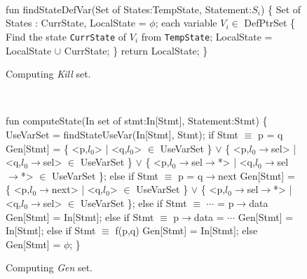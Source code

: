 \begin{figure}
\begin{framed}
{\tt
  \begin{program}{0}
  \FL fun findStateDefVar(Set of States:TempState, Statement:$S_i$)  \{
   Set of States : CurrState, LocalState = $\phi$;
   \FOR each variable $V_i\in$ DefPtrSet \{
   Find the state {\tt CurrState} of $V_i$ from {\tt TempState};
  LocalState = LocalState $\cup$ CurrState;
   \}
   return LocalState;
   \}
  \end{program}
}
\end{framed}
  \caption{Computing \emph{Kill} set.\label{fig:AlgoFindStateDefVar}}
\end{figure}
\begin{figure}
\begin{framed}
{\tt
  \begin{program}{0}
  \FL fun computeState(In set of stmt:In[Stmt], Statement:Stmt)  \{
   UseVarSet = findStateUseVar(In[Stmt], Stmt);
   if Stmt $\equiv$ p = q 
   Gen[Stmt] = \{ <p,$l_0$> | <q,$l_0$> $\in$ UseVarSet \} 
   $\vee$ \{ <p,$l_0\rightarrow$sel> | <q,$l_0\rightarrow$sel> $\in$ UseVarSet \}
   $\vee$ \{ <p,$l_0\rightarrow$sel$\rightarrow$*> | <q,$l_0\rightarrow$sel$\rightarrow$*> $\in$ UseVarSet \};
   else if Stmt $\equiv$ p = q$\rightarrow$next
   Gen[Stmt] = \{ <p,$l_0\rightarrow$next> | <q,$l_0$> $\in$ UseVarSet \} 
   $\vee$ \{ <p,$l_0\rightarrow$sel$\rightarrow$*> | <q,$l_0\rightarrow$sel> $\in$ UseVarSet \};
   else if Stmt $\equiv$ $\cdots$ = p$\rightarrow$data
   Gen[Stmt] = In[Stmt];
   else if Stmt $\equiv$ p$\rightarrow$data = $\cdots$
   Gen[Stmt] = In[Stmt];
   else if Stmt $\equiv$ f(p,q)
   Gen[Stmt] = In[Stmt];
   else Gen[Stmt] = $\phi$;
   \}
  \end{program}
}
\end{framed}
  \caption{Computing \emph{Gen} set. \label{fig:AlgoComputeState}}
\end{figure}
